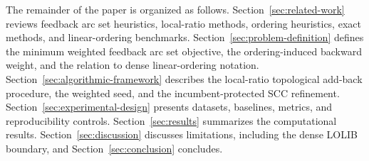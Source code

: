The remainder of the paper is organized as follows. Section~\ref{sec:related-work} reviews feedback arc set heuristics, local-ratio methods, ordering heuristics, exact methods, and linear-ordering benchmarks. Section~\ref{sec:problem-definition} defines the minimum weighted feedback arc set objective, the ordering-induced backward weight, and the relation to dense linear-ordering notation. Section~\ref{sec:algorithmic-framework} describes the local-ratio topological add-back procedure, the weighted seed, and the incumbent-protected SCC refinement. Section~\ref{sec:experimental-design} presents datasets, baselines, metrics, and reproducibility controls. Section~\ref{sec:results} summarizes the computational results. Section~\ref{sec:discussion} discusses limitations, including the dense LOLIB boundary, and Section~\ref{sec:conclusion} concludes.
